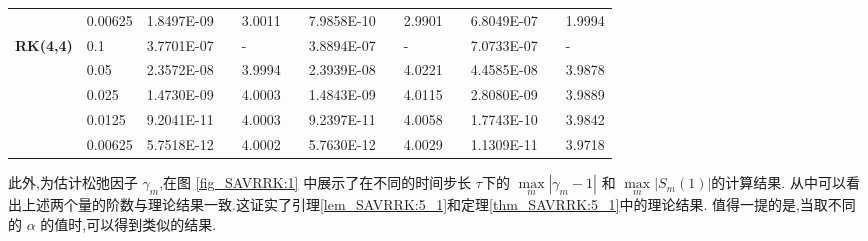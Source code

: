\begin{table}[H]
\begin{tabular}{lllllrlrlrlrlrl}
\multicolumn{2}{l}{} & \multicolumn{2}{l}{0.00625} & 1.8497E-09 &       & 3.0011  &       & 7.9858E-10 &       & 2.9901  &       & 6.8049E-07 &       & 1.9994  \\
\multicolumn{2}{l}{\multirow{5}[1]{*}{\textbf{RK(4,4)}}} & \multicolumn{2}{l}{0.1} & 3.7701E-07 &       & -     &       & 3.8894E-07 &       & -     &       & 7.0733E-07 &       & - \\
\multicolumn{2}{l}{} & \multicolumn{2}{l}{0.05} & 2.3572E-08 &       & 3.9994  &       & 2.3939E-08 &       & 4.0221  &       & 4.4585E-08 &       & 3.9878  \\
\multicolumn{2}{l}{} & \multicolumn{2}{l}{0.025} & 1.4730E-09 &       & 4.0003  &       & 1.4843E-09 &       & 4.0115  &       & 2.8080E-09 &       & 3.9889  \\
\multicolumn{2}{l}{} & \multicolumn{2}{l}{0.0125} & 9.2041E-11 &       & 4.0003  &       & 9.2397E-11 &       & 4.0058  &       & 1.7743E-10 &       & 3.9842  \\
\multicolumn{2}{l}{} & \multicolumn{2}{l}{0.00625} & 5.7518E-12 &       & 4.0002  &       & 5.7630E-12 &       & 4.0029  &       & 1.1309E-11 &       & 3.9718  \\
\bottomrule
\end{tabular}%
\label{tab_SAVRRK:6-1}%
\end{table}%
此外,为估计松弛因子 $\gamma_m$,在图 \ref{fig_SAVRRK:1} 中展示了在不同的时间步长 $\tau$下的 $\max\limits _m\left|\gamma_m-1\right|$ 和 $\max\limits _m\left|S_m(1)\right|$的计算结果.
从中可以看出上述两个量的阶数与理论结果一致.这证实了引理\ref{lem_SAVRRK:5_1}和定理\ref{thm_SAVRRK:5_1}中的理论结果.
值得一提的是,当取不同的 $\alpha$ 的值时,可以得到类似的结果.%

